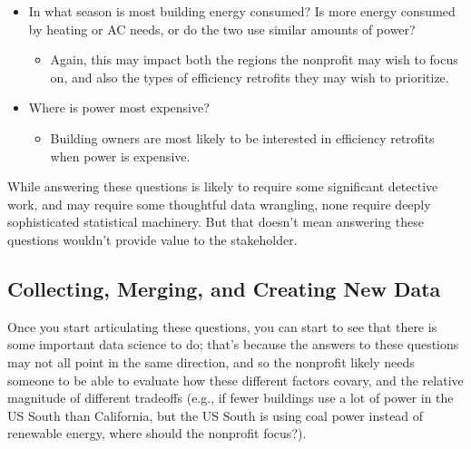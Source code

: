 \documentclass[letterpaper,10pt,english]{jupyterBook}
\begin{document}
\begin{itemize}
\begin{itemize}
\end{itemize}

\item {} 
\sphinxAtStartPar
In what season is most building energy consumed? Is more energy consumed by heating or AC needs, or do the two use similar amounts of power?
\begin{itemize}
\item {} 
\sphinxAtStartPar
Again, this may impact both the regions the non\sphinxhyphen{}profit may wish to focus on, and also the types of efficiency retrofits they may wish to prioritize.

\end{itemize}

\item {} 
\sphinxAtStartPar
Where is power most expensive?
\begin{itemize}
\item {} 
\sphinxAtStartPar
Building owners are most likely to be interested in efficiency retrofits when power is expensive.

\end{itemize}

\end{itemize}

\sphinxAtStartPar
While answering these questions is likely to require some significant detective work, and may require some thoughtful data wrangling, none require deeply sophisticated statistical machinery. But that doesn’t mean answering these questions wouldn’t provide  value to the stakeholder.


\subsection{Collecting, Merging, and Creating New Data}
\label{\detokenize{30_questions/10_using_exploratory_questions:collecting-merging-and-creating-new-data}}
\sphinxAtStartPar
Once you start articulating these questions, you can start to see that there is some important data science to do; that’s because the answers to these questions may not all point in the same direction, and so the non\sphinxhyphen{}profit likely needs someone to be able to evaluate how these different factors co\sphinxhyphen{}vary, and the relative magnitude of different trade\sphinxhyphen{}offs (e.g., if fewer buildings use a lot of power in the US South than California, but the US South is using coal power instead of renewable energy, where should the non\sphinxhyphen{}profit focus?).
\end{document}
